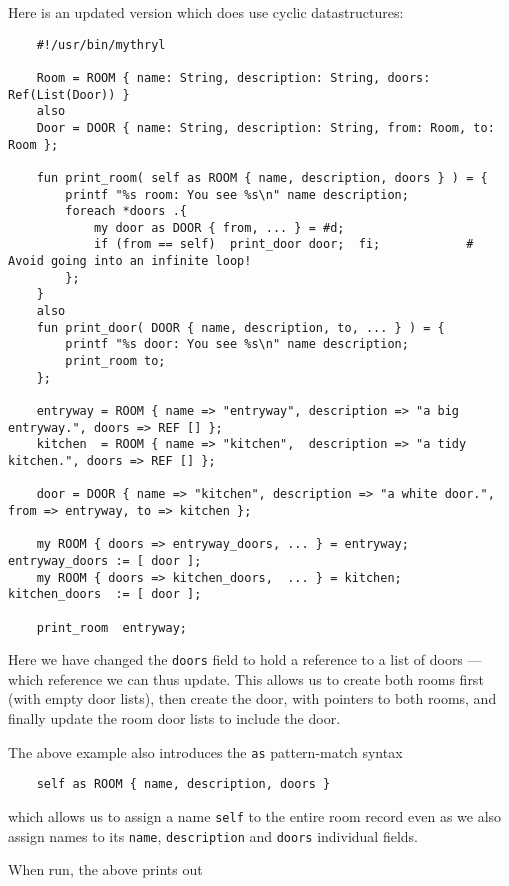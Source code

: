 Here is an updated version which does use cyclic datastructures:

\begin{verbatim}
    #!/usr/bin/mythryl

    Room = ROOM { name: String, description: String, doors: Ref(List(Door)) }
    also
    Door = DOOR { name: String, description: String, from: Room, to: Room };

    fun print_room( self as ROOM { name, description, doors } ) = {
        printf "%s room: You see %s\n" name description;
        foreach *doors .{
            my door as DOOR { from, ... } = #d;
            if (from == self)  print_door door;  fi;            # Avoid going into an infinite loop!
        };
    }
    also
    fun print_door( DOOR { name, description, to, ... } ) = {
        printf "%s door: You see %s\n" name description;
        print_room to;
    };

    entryway = ROOM { name => "entryway", description => "a big entryway.", doors => REF [] };
    kitchen  = ROOM { name => "kitchen",  description => "a tidy kitchen.", doors => REF [] };

    door = DOOR { name => "kitchen", description => "a white door.", from => entryway, to => kitchen };

    my ROOM { doors => entryway_doors, ... } = entryway;   entryway_doors := [ door ];
    my ROOM { doors => kitchen_doors,  ... } = kitchen;    kitchen_doors  := [ door ];

    print_room  entryway;
\end{verbatim}

Here we have changed the {\tt doors} field to hold a reference to a list of doors --- 
which reference we can thus update.  This allows us to create both rooms first (with empty door lists), 
then create the door, with pointers to both rooms, and finally update the room door lists to 
include the door.

The above example also introduces the {\tt as} pattern-match syntax

\begin{verbatim}
    self as ROOM { name, description, doors }
\end{verbatim}

which allows us to assign a name {\tt self} to the 
entire room record even as we also assign names to its {\tt name}, {\tt description} 
and {\tt doors} individual fields.

When run, the above prints out

